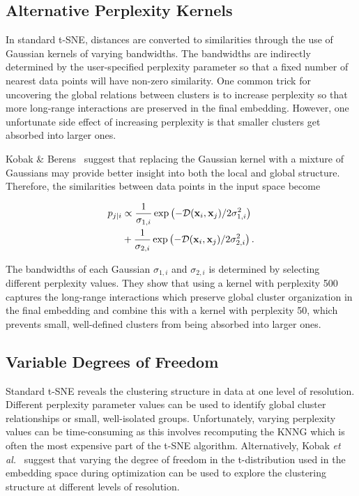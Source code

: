\documentclass[twocolumn]{bmcart}
\begin{document}
\subsection*{Alternative Perplexity Kernels}

In standard t-SNE, distances are converted to similarities through the use of Gaussian kernels of varying bandwidths. The bandwidths are indirectly determined by the user-specified perplexity parameter so that a fixed number of nearest data points will have non-zero similarity. One common trick for uncovering the global relations between clusters is to increase perplexity so that more long-range interactions are preserved in the final embedding. However, one unfortunate side effect of increasing perplexity is that smaller clusters get absorbed into larger ones.

Kobak \& Berens~\cite{kobak2019art} suggest that replacing the Gaussian kernel with a mixture of Gaussians may provide better insight into both the local and global structure. Therefore, the similarities between data points in the input space become

\begin{align}
  p_{j\mid i} &\propto \frac{1}{\sigma_{1,i}} \exp \left ( -\mathcal{D}(\mathbf{x}_i, \mathbf{x}_j ) / 2\sigma_{1,i}^2 \right ) \notag \\
  &+ \frac{1}{\sigma_{2,i}} \exp \left ( -\mathcal{D}(\mathbf{x}_i, \mathbf{x}_j ) / 2\sigma_{2,i}^2 \right ).
\end{align}

The bandwidths of each Gaussian $\sigma_{1,i}$ and $\sigma_{2,i}$ is determined by selecting different perplexity values. They show that using a kernel with perplexity 500 captures the long-range interactions which preserve global cluster organization in the final embedding and combine this with a kernel with perplexity 50, which prevents small, well-defined clusters from being absorbed into larger ones.

\subsection*{Variable Degrees of Freedom}

Standard t-SNE reveals the clustering structure in data at one level of resolution. Different perplexity parameter values can be used to identify global cluster relationships or small, well-isolated groups. Unfortunately, varying perplexity values can be time-consuming as this involves recomputing the KNNG which is often the most expensive part of the t-SNE algorithm. Alternatively, Kobak \textit{et al.}~\cite{kobak2019heavy} suggest that varying the degree of freedom in the t-distribution used in the embedding space during optimization can be used to explore the clustering structure at different levels of resolution. 
\end{document}

